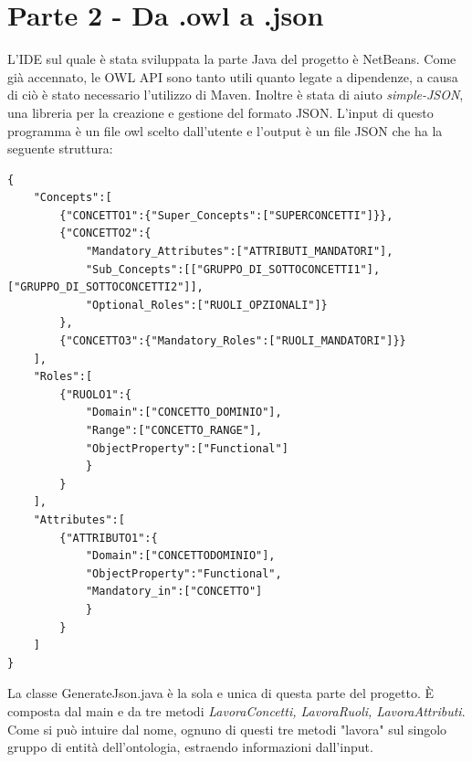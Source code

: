 \documentclass[Lau,binding=0.6cm]{sapthesis}
\begin{document}
\chapter{Parte 2 - Da .owl a .json }
L'IDE sul quale è stata sviluppata la parte Java del progetto è NetBeans. Come già accennato, le OWL API sono tanto utili quanto legate a dipendenze, a causa di ciò è stato necessario l'utilizzo di Maven. Inoltre è stata di aiuto \textit{simple-JSON}, una libreria per la creazione e gestione del formato JSON. L'input di questo programma è un file owl scelto dall'utente e l'output è un file JSON che ha la seguente struttura:
\begin{verbatim}
{   
    "Concepts":[
        {"CONCETTO1":{"Super_Concepts":["SUPERCONCETTI"]}},
        {"CONCETTO2":{
            "Mandatory_Attributes":["ATTRIBUTI_MANDATORI"],
            "Sub_Concepts":[["GRUPPO_DI_SOTTOCONCETTI1"],["GRUPPO_DI_SOTTOCONCETTI2"]],
            "Optional_Roles":["RUOLI_OPZIONALI"]}
        },
        {"CONCETTO3":{"Mandatory_Roles":["RUOLI_MANDATORI"]}}
    ],
    "Roles":[
        {"RUOLO1":{
        	"Domain":["CONCETTO_DOMINIO"],
        	"Range":["CONCETTO_RANGE"],
        	"ObjectProperty":["Functional"]
        	}
        }
    ],
    "Attributes":[
        {"ATTRIBUTO1":{
        	"Domain":["CONCETTODOMINIO"],
        	"ObjectProperty":"Functional",
        	"Mandatory_in":["CONCETTO"]
        	}
        }
    ]
}
\end{verbatim}
La classe GenerateJson.java è la sola e unica di questa parte del progetto. È composta dal main e da tre metodi  \textit{LavoraConcetti, LavoraRuoli, LavoraAttributi}. Come si può intuire dal nome, ognuno di questi tre metodi "lavora" sul singolo gruppo di entità dell'ontologia, estraendo informazioni dall'input.
\end{document}
